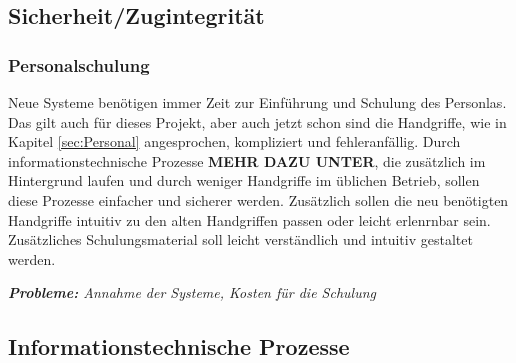 \subsection{Sicherheit/Zugintegrität}
\subsubsection{Personalschulung}
Neue Systeme benötigen immer Zeit zur Einführung und Schulung des Personlas. Das gilt auch für dieses Projekt, aber auch jetzt schon sind die Handgriffe, wie in Kapitel \ref{sec:Personal} angesprochen, kompliziert und fehleranfällig. Durch informationstechnische Prozesse \textbf{MEHR DAZU UNTER}, die zusätzlich im Hintergrund laufen und durch weniger Handgriffe im üblichen Betrieb, sollen diese Prozesse einfacher und sicherer werden. Zusätzlich sollen die neu benötigten Handgriffe intuitiv zu den alten Handgriffen passen oder leicht erlenrnbar sein. Zusätzliches Schulungsmaterial soll leicht verständlich und intuitiv gestaltet werden.\par
\textit{\textbf{Probleme:} Annahme der Systeme, Kosten für die Schulung}

\subsection{Informationstechnische Prozesse}
